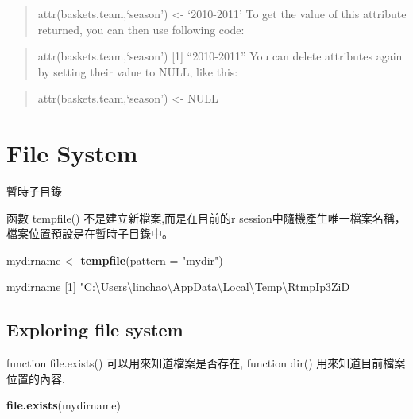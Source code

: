 \documentclass[]{book}
\newenvironment{Shaded}{\begin{snugshade}}{\end{snugshade}}
\newcommand{\DataTypeTok}[1]{\textcolor[rgb]{0.13,0.29,0.53}{#1}}
\newcommand{\KeywordTok}[1]{\textcolor[rgb]{0.13,0.29,0.53}{\textbf{#1}}}
\newcommand{\NormalTok}[1]{#1}
\newcommand{\StringTok}[1]{\textcolor[rgb]{0.31,0.60,0.02}{#1}}
\theoremstyle{definition}
\theoremstyle{definition}
\theoremstyle{definition}
\theoremstyle{remark}
\begin{document}
\begin{quote}
attr(baskets.team,`season') \textless{}- `2010-2011' To get the value of
this attribute returned, you can then use following code:
\end{quote}

\begin{quote}
attr(baskets.team,`season') {[}1{]} ``2010-2011'' You can delete
attributes again by setting their value to NULL, like this:
\end{quote}

\begin{quote}
attr(baskets.team,`season') \textless{}- NULL
\end{quote}

\hypertarget{file-system}{%
\chapter{File System}\label{file-system}}

暫時子目錄

函數 tempfile() 不是建立新檔案,而是在目前的r
session中隨機產生唯一檔案名稱，檔案位置預設是在暫時子目錄中。

\begin{Shaded}
\begin{Highlighting}[]
\NormalTok{mydirname <-}\StringTok{ }\KeywordTok{tempfile}\NormalTok{(}\DataTypeTok{pattern =} \StringTok{"mydir"}\NormalTok{)}
\end{Highlighting}
\end{Shaded}

mydirname {[}1{]}
"C:\textbackslash{}Users\textbackslash{}linchao\textbackslash{}AppData\textbackslash{}Local\textbackslash{}Temp\textbackslash{}RtmpIp3ZiD\\

\hypertarget{exploring-file-system}{%
\section{Exploring file system}\label{exploring-file-system}}

function file.exists() 可以用來知道檔案是否存在, function dir()
用來知道目前檔案位置的內容.

\begin{Shaded}
\begin{Highlighting}[]
\KeywordTok{file.exists}\NormalTok{(mydirname)}
\end{Highlighting}
\end{Shaded}
\end{document}
